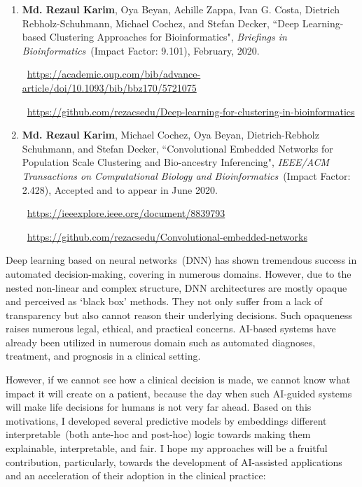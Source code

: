 \begin{appendices}
\begin{enumerate}[noitemsep]
	\item \textbf{Md. Rezaul Karim}, Oya Beyan, Achille Zappa, Ivan G. Costa, Dietrich Rebholz-Schuhmann, Michael Cochez, and Stefan Decker, ``Deep Learning-based Clustering Approaches for Bioinformatics", \emph{Briefings in Bioinformatics}~(Impact Factor: 9.101), February, 2020.
	
	\faLink~\url{https://academic.oup.com/bib/advance-article/doi/10.1093/bib/bbz170/5721075}

	\faGithub~\url{https://github.com/rezacsedu/Deep-learning-for-clustering-in-bioinformatics}
		
	\item \textbf{Md. Rezaul Karim}, Michael Cochez, Oya Beyan, Dietrich-Rebholz Schuhmann, and Stefan Decker, ``Convolutional Embedded Networks for Population Scale Clustering and Bio-ancestry Inferencing", \emph{IEEE/ACM Transactions on Computational Biology and Bioinformatics}~(Impact Factor: 2.428), Accepted and to appear in June 2020.
    
    \faLink~\url{https://ieeexplore.ieee.org/document/8839793}

	\faGithub~\url{https://github.com/rezacsedu/Convolutional-embedded-networks}
\end{enumerate}

Deep learning based on neural networks~(DNN) has shown tremendous success in automated decision-making, covering in numerous domains. However, due to the nested non-linear and complex structure, DNN architectures are mostly opaque and perceived as `black box' methods. They not only suffer from a lack of transparency but also cannot reason their underlying decisions. Such opaqueness raises numerous legal, ethical, and practical concerns. AI-based systems have already been utilized in numerous domain such as automated diagnoses, treatment, and prognosis in a clinical setting. 

\hspace*{5mm} However, if we cannot see how a clinical decision is made, we cannot know what impact it will create on a patient, because the day when such AI-guided systems will make life decisions for humans is not very far ahead. Based on this motivations, I developed several predictive models by embeddings different interpretable~(both ante-hoc and post-hoc) logic towards making them explainable, interpretable, and fair. I hope my approaches will be a fruitful contribution, particularly, towards the development of AI-assisted applications and an acceleration of their adoption in the clinical practice: 


\end{appendices}
